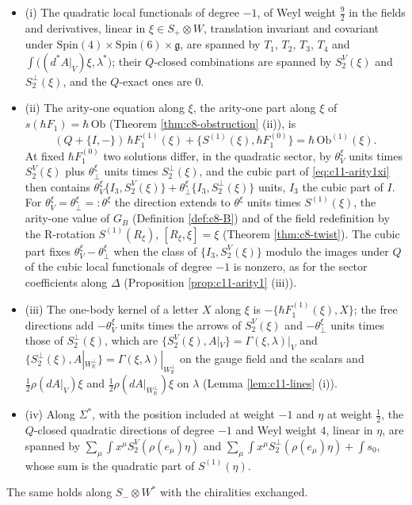\begin{proposition}
\label{prop:c11-freexi}
\begin{itemize}
\item (i) The quadratic local functionals of degree $-1$, of Weyl weight $\tfrac92$ in the fields and derivatives, linear in $\xi\in S_+\otimes W$, translation invariant and covariant under $\mathrm{Spin}(4)\times\mathrm{Spin}(6)\times\mathfrak g$, are spanned by $T_1$, $T_2$, $T_3$, $T_4$ and $\int\big((d^*A|_V)\xi,\lambda^*\big)$; their $Q$-closed combinations are spanned by $S^V_2(\xi)$ and $S^\perp_2(\xi)$, and the $Q$-exact ones are $0$.
\item (ii) The arity-one equation along $\xi$, the arity-one part along $\xi$ of $s(\hbar F_1)=\hbar\,\mathrm{Ob}$ (Theorem \ref{thm:c8-obstruction} (ii)), is
\begin{equation}
(Q+\{I,-\})\,\hbar F_1^{(1)}(\xi)+\big\{S^{(1)}(\xi),\hbar F_1^{(0)}\big\}=\hbar\,\mathrm{Ob}^{(1)}(\xi).
\label{eq:c11-arity1xi}
\end{equation}
At fixed $\hbar F_1^{(0)}$ two solutions differ, in the quadratic sector, by $\theta^\xi_V$ units times $S^V_2(\xi)$ plus $\theta^\xi_\perp$ units times $S^\perp_2(\xi)$, and the cubic part of \eqref{eq:c11-arity1xi} then contains $\theta^\xi_V\{I_3,S^V_2(\xi)\}+\theta^\xi_\perp\{I_3,S^\perp_2(\xi)\}$ units, $I_3$ the cubic part of $I$. For $\theta^\xi_V=\theta^\xi_\perp=:\theta^\xi$ the direction extends to $\theta^\xi$ units times $S^{(1)}(\xi)$, the arity-one value of $G_B$ (Definition \ref{def:c8-B}) and of the field redefinition by the R-rotation $S^{(1)}(R_\xi)$, $[R_\xi,\xi]=\xi$ (Theorem \ref{thm:c8-twist}). The cubic part fixes $\theta^\xi_V-\theta^\xi_\perp$ when the class of $\{I_3,S^V_2(\xi)\}$ modulo the images under $Q$ of the cubic local functionals of degree $-1$ is nonzero, as for the sector coefficients along $\Delta$ (Proposition \ref{prop:c11-arity1} (iii)).
\item (iii) The one-body kernel of a letter $X$ along $\xi$ is $-\{\hbar F_1^{(1)}(\xi),X\}$; the free directions add $-\theta^\xi_V$ units times the arrows of $S^V_2(\xi)$ and $-\theta^\xi_\perp$ units times those of $S^\perp_2(\xi)$, which are $\{S^V_2(\xi),A|_V\}=\Gamma(\xi,\lambda)|_V$ and $\{S^\perp_2(\xi),A|_{W_{\mathbb R}^\perp}\}=\Gamma(\xi,\lambda)|_{W_{\mathbb R}^\perp}$ on the gauge field and the scalars and $\tfrac12\rho(dA|_V)\xi$ and $\tfrac12\rho(dA|_{W_{\mathbb R}^\perp})\xi$ on $\lambda$ (Lemma \ref{lem:c11-lines} (i)).
\item (iv) Along $\Sigma^*$, with the position included at weight $-1$ and $\eta$ at weight $\tfrac12$, the $Q$-closed quadratic directions of degree $-1$ and Weyl weight $4$, linear in $\eta$, are spanned by $\sum_\mu\int x^\mu S^V_2(\rho(e_\mu)\eta)$ and $\sum_\mu\int x^\mu S^\perp_2(\rho(e_\mu)\eta)+\int s_0$, whose sum is the quadratic part of $S^{(1)}(\eta)$.
\end{itemize}
The same holds along $S_-\otimes W^*$ with the chiralities exchanged.
\end{proposition}

